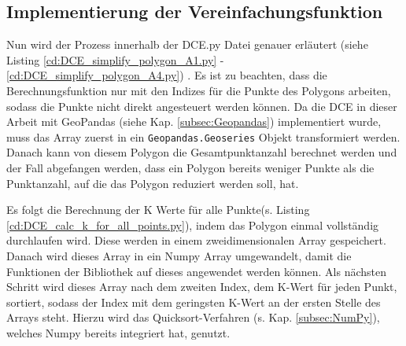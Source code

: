 {	\subsection{Implementierung der Vereinfachungsfunktion \label{impl:DCE_SimplyfierFunc}}

	

	Nun wird der Prozess innerhalb der DCE.py Datei genauer erläutert \ifimportant (siehe Listing \ref{cd:DCE_simplify_polygon_A1.py} - \ref{cd:DCE_simplify_polygon_A4.py}) \fi. Es ist zu beachten, dass die Berechnungsfunktion nur mit den Indizes für die Punkte des Polygons arbeiten, sodass die Punkte nicht direkt angesteuert werden können. Da die DCE in dieser Arbeit mit GeoPandas (siehe Kap. \ref{subsec:Geopandas}) implementiert wurde, muss das Array zuerst in ein \lstinline|Geopandas.Geoseries| Objekt transformiert werden. \\
	Danach kann von diesem Polygon die Gesamtpunktanzahl berechnet werden und der Fall abgefangen werden, dass ein Polygon bereits weniger Punkte als die Punktanzahl, auf die das Polygon reduziert werden soll, hat. \\
	\ifimportant
	
	\fi
	
	Es folgt die Berechnung der K Werte für alle Punkte\ifimportant(s. Listing \ref{cd:DCE_calc_k_for_all_points.py})\fi, indem das Polygon einmal vollständig durchlaufen wird. Diese werden in einem zweidimensionalen Array gespeichert. Danach wird dieses Array in ein Numpy Array umgewandelt, damit die Funktionen der Bibliothek auf dieses angewendet werden können. Als nächsten Schritt wird dieses Array nach dem zweiten Index, dem K-Wert für jeden Punkt, sortiert, sodass der Index mit dem geringsten K-Wert an der ersten Stelle des Arrays steht. Hierzu wird das Quicksort-Verfahren (s. Kap. \ref{subsec:NumPy}), welches Numpy bereits integriert hat, genutzt. \\
	\ifimportant
	
	\fi

}
